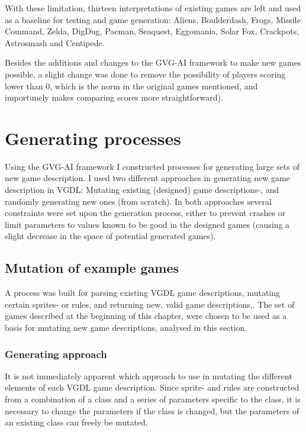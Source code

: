 \documentclass[a4paper,titlepage,final]{report}
\begin{document}
With these limitation, thirteen interpretations of existing games are left and used as a baseline for testing and game generation: Aliens, Boulderdash, Frogs, Missile Command, Zelda, DigDug, Pacman, Seaquest, Eggomania, Solar Fox, Crackpots, Astrosmash and Centipede.

Besides the additions and changes to the GVG-AI framework to make new games possible, a slight change was done to remove the possibility of players scoring lower than 0, which is the norm in the original games mentioned, and importunely makes comparing scores more straightforward).




\section{Generating processes}
\label{sec_task1genApproach}
Using the GVG-AI framework  I constructed processes for generating large sets of new game description.
I used two different approaches in generating new game description in VGDL: 
Mutating existing (designed) game descriptions-, and randomly generating new ones (from scratch).
In both approaches several constraints were set upon the generation process, either to prevent crashes or limit parameters to values known to be good in the designed games (causing a slight decrease in the space of potential generated games).

\subsection{Mutation of example games}
\label{ssec_task1mutation}
A process was built for parsing existing VGDL game descriptions, mutating certain sprites- or rules, and returning new, valid game descriptions,.
The set of games described at the beginning of this chapter, were chosen to be used as a basis for mutating new game descriptions, analysed in this section.



\subsubsection*{Generating approach}
It is not immediately apparent which approach to use in mutating the different elements of  each VGDL game description.
Since sprite- and rules are constructed from a combination of a class and a series of parameters specific to the class, it is necessary to change the parameters if the class is changed, but the parameters of an existing class can freely be mutated.
\end{document}
